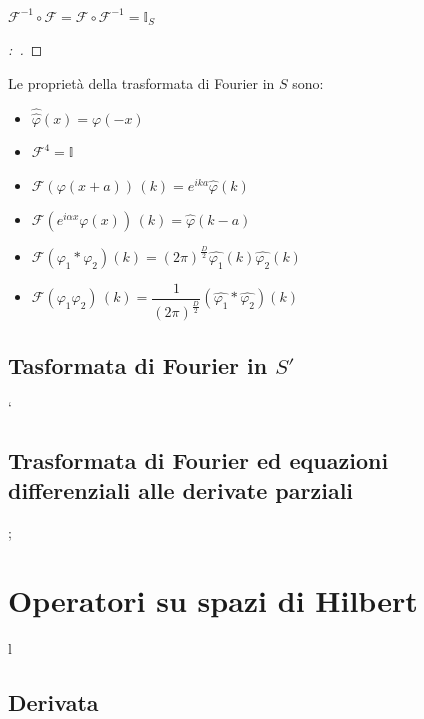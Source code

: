 \documentclass[11pt,a4paper,twoside]{book}
\newenvironment{proposizione}[1][\empty]{\begin{Proposizione}{
\ifx\empty#1\relax\else\mdseries\itshape#1\\\fi
}{}}{\end{Proposizione}}
\newenvironment{dimo}[1][\proofname]{
	\begin{tcolorbox}[
	breakable, 
	enhanced, 
	interior hidden, 
	frame hidden, 
	borderline west = {1pt}{0pt}{gray}, 
	top=0pt, bottom=0pt, left=0pt]
\begin{proof}[#1:~]
}
{
\end{proof}
\end{tcolorbox}
}
\theoremstyle{esss}
\theoremstyle{dotless}
\numberwithin{equation}{section} %
\begin{document}
\begin{proposizione}$\mathcal{F}^{-1}\circ\mathcal{F}=\mathcal{F}\circ\mathcal{F}^{-1}=\mathbb{I}_{S}$\end{proposizione}
\begin{dimo}

\end{dimo}

Le proprietà della trasformata di Fourier in $S$ sono:\begin{itemize}[label=$\cdot$]
\item $\hat{\hat{\varphi}}(x)=\varphi(-x)$ 
\item $\mathcal{F}^4=\mathbb{I}$
\item $\mathcal{F}\left(\varphi(x+a)\right)\,(k)=e^{ika}\hat{\varphi}(k)$
\item $\mathcal{F}\left(e^{i\alpha x}\varphi(x)\right)\,(k)=\hat{\varphi}(k-a)$
\item $\mathcal{F}\left(\varphi_1 * \varphi_2\right) (k)=(2\pi)^{\frac{D}{2}}\hat{\varphi_1}(k)\hat{\varphi_2}(k)$
\item $\mathcal{F}(\varphi_1 \varphi_2)\,(k)=\dfrac{1}{(2\pi)^\frac{D}{2}}(\hat{\varphi_1} * \hat{\varphi_2})(k)$
\end{itemize}

 
 
\subsection{Tasformata di Fourier in $S'$}
`

\subsection{Trasformata di Fourier ed equazioni differenziali alle derivate parziali}
;

\section{Operatori su spazi di Hilbert}
l

\subsection{Derivata}
\end{document}

